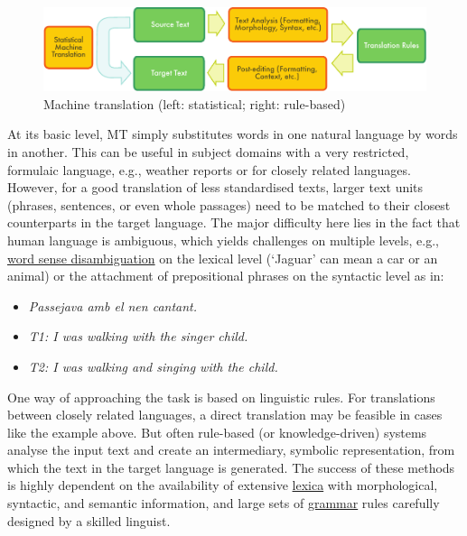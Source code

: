 \documentclass[]{../../metanetpaper}
\begin{document}
\begin{multicols}{2}
\begin{figure}[htb]
  \center
  \includegraphics[width=\textwidth]{../_media/english/machine_translation}
  \caption{Machine translation (left: statistical; right: rule-based)}
  \label{fig:mtarch_en}
\end{figure}

At its basic level, MT simply substitutes words in one natural language by words in another. This can be useful in subject domains with a very restricted, formulaic language, e.g., weather reports or for closely related languages. However, for a good translation of less standardised texts, larger text units (phrases, sentences, or even whole passages) need to be matched to their closest counterparts in the target language. The major difficulty here lies in the fact that human language is ambiguous, which yields challenges on multiple levels, e.g., \underline{word sense disambiguation} on the lexical level (‘Jaguar’ can mean a car or an animal) or the attachment of prepositional phrases on the syntactic level as in:
\begin{itemize}
\item \textit{Passejava amb el nen cantant.}
\item \textit{T1: I was walking with the singer child.}
\item \textit{T2: I was walking and singing with the child.}
\end{itemize}

One way of approaching the task is based on linguistic rules. For translations between closely related languages, a direct translation may be feasible in cases like the example above. But often rule-based (or knowledge-driven) systems analyse the input text and create an intermediary, symbolic representation, from which the text in the target language is generated. The success of these methods is highly dependent on the availability of extensive \underline{lexica} with morphological, syntactic, and semantic information, and large sets of \underline{grammar} rules carefully designed by a skilled linguist.


\end{multicols}
\end{document}
